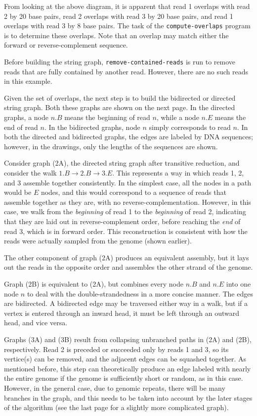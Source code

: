 \documentclass[letterpaper,12pt]{article}
\begin{document}
From looking at the above diagram, it is apparent that read 1 overlaps with read
2 by 20 base pairs, read 2 overlaps with read 3 by 20 base pairs, and read 1
overlaps with read 3 by 8 base pairs.  The task of the {\tt compute-overlaps}
program is to determine these overlaps.  Note that an overlap may match either
the forward or reverse-complement sequence.

Before building the string graph, {\tt remove-contained-reads} is run to remove
reads that are fully contained by another read.  However, there are no such
reads in this example.

Given the set of overlaps, the next step is to build the bidirected or directed
string graph.  Both these graphs are shown on the next page.  In the directed
graphs, a node $n.B$ means the beginning of read $n$, while a node $n.E$ means
the end of read $n$.  In the bidirected graphs, node $n$ simply corresponds to
read $n$.  In both the directed and bidirected graphs, the edges are labeled by
DNA sequences; however, in the drawings, only the lengths of the sequences are
shown.

Consider graph (2A), the directed string graph after transitive reduction, and
consider the walk $1.B \to 2.B \to 3.E$.  This represents a way in which reads
1, 2, and 3 assemble together consistently.  In the simplest case, all the nodes
in a path would be $E$ nodes, and this would correspond to a sequence of reads
that assemble together as they are, with no reverse-complementation.  However,
in this case, we walk from the {\em beginning} of read 1 to the {\em beginning}
of read 2, indicating that they are laid out in reverse-complement order, before
reaching the {\em end} of read 3, which is in forward order.  This
reconstruction is consistent with how the reads were actually sampled from the
genome (shown earlier).

The other component of graph (2A) produces an equivalent assembly, but it lays
out the reads in the opposite order and assembles the other strand of the
genome.

Graph (2B) is equivalent to (2A), but combines every node $n.B$ and $n.E$ into
one node $n$ to deal with the double-strandedness in a more concise manner.  The
edges are bidirected.  A bidirected edge may be traversed either way in a walk,
but if a vertex is entered through an inward head, it must be left through an
outward head, and vice versa.

Graphs (3A) and (3B) result from collapsing unbranched paths in (2A) and (2B),
respectively.  Read 2 is preceded or succeeded only by reads 1 and 3, so its
vertice(s) can be removed, and the adjacent edges can be squashed together.  As
mentioned before, this step can theoretically produce an edge labeled with
nearly the entire genome if the genome is sufficiently short or random, as in
this case.  However, in the general case, due to genomic repeats, there will be
many branches in the graph, and this needs to be taken into account by the later
stages of the algorithm (see the last page for a slightly more complicated
graph).
\end{document}
